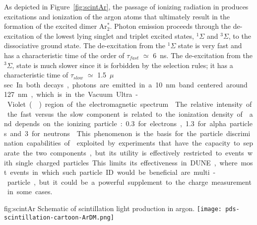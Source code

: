 As depicted in Figure~\ref{fig:scintAr}, the passage of ionizing radiation in \lar produces excitations and ionization of the argon atoms that ultimately result in the formation of the excited dimer Ar$^*_2$.  
Photon emission proceeds through the de-excitation of the lowest lying singlet and triplet excited states, $^{1}\Sigma$ and 
$^{3}\Sigma$, to the dissociative ground state. The de-excitation from the $^{1}\Sigma$ state is very fast and has a characteristic time of the order of $\tau_{fast}$ $\simeq$ \SI{6}{ns}. The de-excitation from the $^{3}\Sigma$, state is much slower since it is forbidden by the selection rules; it has a characteristic time of $\tau_{slow}$ $\simeq$ \SI{1.5}{$\mu$sec}. %
In both decays, photons are emitted in a \SI{10}{nm} band centered around \SI{127}{nm}, which is in the Vacuum Ultra-Violet () region of the electromagnetic spectrum~\cite{Heindl:2010zz}.
The relative intensity of the  fast %
versus the slow component is related to the ionization density of \lar and depends on the ionizing particle: \num{0.3} for electrons, \num{1.3} for alpha particles and \num{3} for neutrons~\cite{PhysRevB.27.5279}. 
This phenomenon is the basis for the particle discrimination capabilities of \lar exploited by experiments that have the capacity to separate the two components, but its utility is effectively restricted to events with single charged particles. This %
limits its effectiveness in DUNE, where most events in which such particle ID would be beneficial are multi-particle, but %
it could be a powerful supplement to the charge measurement in some cases.

\begin{dunefigure}{fig:scintAr}
{Schematic of scintillation light production in argon.}
\texttt{[image: pds-scintillation-cartoon-ArDM.png]}
\end{dunefigure}



